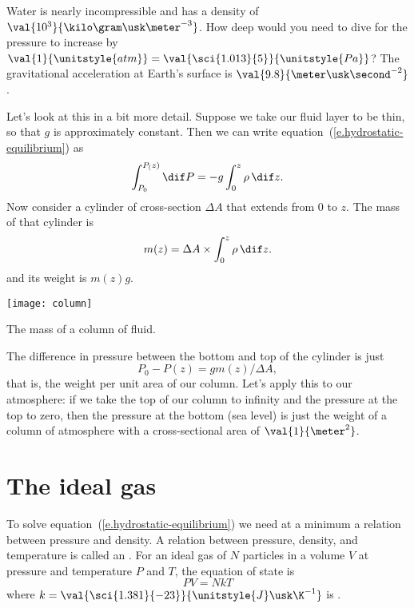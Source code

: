 \begin{exercisebox}
Water is nearly incompressible and has a density of $\val{10^{3}}{\kilo\gram\usk\meter^{-3}}$.  How deep would you need to dive for the pressure to increase by $\val{1}{\unitstyle{atm}} = \val{\sci{1.013}{5}}{\unitstyle{Pa}}$?  The gravitational acceleration at Earth's surface is $\val{9.8}{\meter\usk\second^{-2}}$.
\end{exercisebox}

Let's look at this in a bit more detail.  Suppose we take our fluid layer to be thin, so that $g$ is approximately constant. Then we can write equation~(\ref{e.hydrostatic-equilibrium}) as
\[ \int_{P_{0}}^{P_(z)} \dif P = -g\int_{0}^{z} \rho\,\dif z. \]
Now consider a cylinder of cross-section $\Delta A$ that extends from $0$ to $z$.  The mass of that cylinder is
\[ m(z) = \Delta A\times\int_{0}^{z}\rho \,\dif z.
\]
and its weight is $m(z)g$.
\begin{marginfigure}
\centering\texttt{[image: column]}
\caption[The mass of a column of fluid]{
The mass of a column of fluid.
\label{f.column}}
\end{marginfigure}

The difference in pressure between the bottom and top of the cylinder is just
\[ P_{0}-P(z) = g m(z)/\Delta A, \]
that is, the weight per unit area of our column.  Let's apply this to our atmosphere:
if we take the top of our column to infinity and the pressure at the top to zero, then the pressure at the bottom (sea level) is just the weight of a column of atmosphere with a cross-sectional area of $\val{1}{\meter^{2}}$.

\section{The ideal gas}\label{s.ideal-gas}
To solve equation~(\ref{e.hydrostatic-equilibrium}) we need at a minimum a relation between pressure and density. A relation between pressure, density, and temperature is called an .
For an ideal gas of $N$ particles in a volume $V$ at pressure and temperature $P$ and $T$, the equation of state is
\begin{equation}\label{e.ideal-gas-eos}
PV = NkT
\end{equation}
where $k = \val{\sci{1.381}{-23}}{\unitstyle{J}\usk\K^{-1}}$ is .

